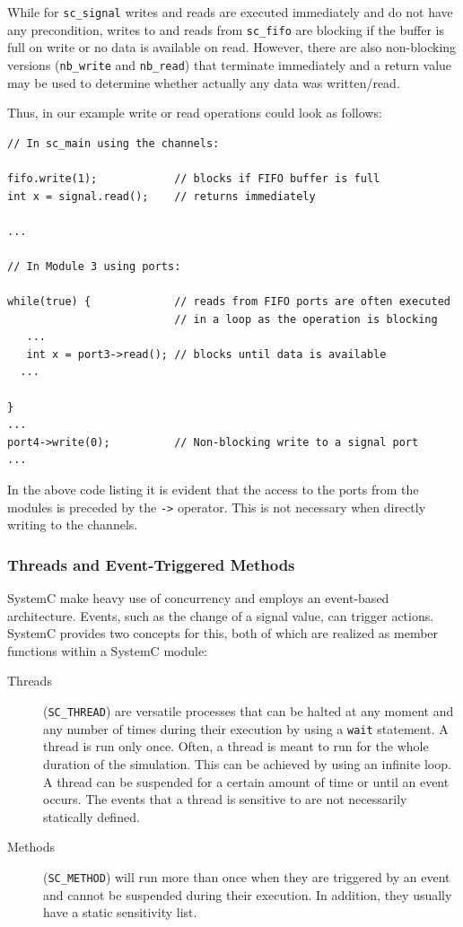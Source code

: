 \documentclass{template/openetcs_article}
\begin{document}
While for \texttt{sc\_signal} writes and reads are executed immediately and do not have any precondition, writes to and reads from \texttt{sc\_fifo} are blocking if the buffer is full on write or no data is available on read. However, there are also non-blocking versions (\texttt{nb\_write} and \texttt{nb\_read}) that terminate immediately and a return value may be used to determine whether actually any data was written/read.

Thus, in our example write or read operations could look as follows:
{\small
\begin{lstlisting}
// In sc_main using the channels:

fifo.write(1);            // blocks if FIFO buffer is full
int x = signal.read();    // returns immediately

...

// In Module 3 using ports:

while(true) {             // reads from FIFO ports are often executed
                          // in a loop as the operation is blocking
   ...
   int x = port3->read(); // blocks until data is available
  ...

}
...
port4->write(0);          // Non-blocking write to a signal port
...
\end{lstlisting}
}

In the above code listing it is evident that the access to the ports from the modules is preceded by the \texttt{->} operator. This is not necessary when directly writing to the channels.

\subsubsection{Threads and Event-Triggered Methods}

SystemC make heavy use of concurrency and employs an event-based architecture. Events, such as the change of a signal value, can trigger actions. SystemC provides two concepts for this, both of which are realized as member functions within a SystemC module:

\begin{description}
\item[Threads] (\texttt{SC\_THREAD}) are versatile processes that can be halted at any moment and any number of times during their execution by using a \texttt{wait} statement. A thread is run only once. Often, a thread is meant to run for the whole duration of the simulation. This can be achieved by using an infinite loop. A thread can be suspended for a certain amount of time or until an event occurs. The events that a thread is sensitive to are not necessarily statically defined.
\item[Methods] (\texttt{SC\_METHOD}) will run more than once when they are triggered by an event and cannot be suspended during their execution. In addition, they usually have a static sensitivity list.
\end{description}
\end{document}
